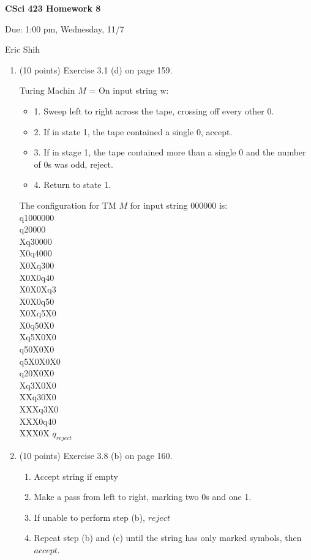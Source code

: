 \documentclass[11pt]{article}
\begin{document}
\begin{LARGE}
\centerline {\bf CSci 423 Homework 8}
\end{LARGE}
\vskip 0.25cm

\centerline{Due: 1:00 pm, Wednesday, 11/7}
\centerline{Eric Shih}

\begin{enumerate}
  \item (10 points) Exercise 3.1 (d) on page 159.
    \begin{center}
     Turing Machin $M$ = On input string w:
     \begin{itemize}
      \item{1.} Sweep left to right across the tape, crossing off every other 0.
      \item{2.} If in state 1, the tape contained a single 0, accept.
      \item{3.} If in stage 1, the tape contained more than a single 0 and the number of 0s was odd, reject.
      \item{4.} Return to state 1.
     \end{itemize}
    \end{center}
    
     The configuration for TM $M$ for input string 000000 is: \\
     q1000000 \\ q20000 \\ Xq30000 \\ X0q4000 \\ X0Xq300 \\ X0X0q40 \\ X0X0Xq3 \\ X0X0q50 \\ X0Xq5X0 \\ X0q50X0 \\ Xq5X0X0 \\ q50X0X0 \\
     q5X0X0X0 \\ q20X0X0 \\ Xq3X0X0 \\ XXq30X0 \\ XXXq3X0 \\ XXX0q40 \\ XXX0X $q_{reject}$

  \item (10 points) Exercise 3.8 (b) on page 160.
    \begin{enumerate}
     \item Accept string if empty
     \item Make a pass from left to right, marking two 0s and one 1.
     \item If unable to perform step (b), $reject$
     \item Repeat step (b) and (c) until the string has only marked symbols, then $accept$.
    \end{enumerate}


\end{enumerate}
\end{document}
